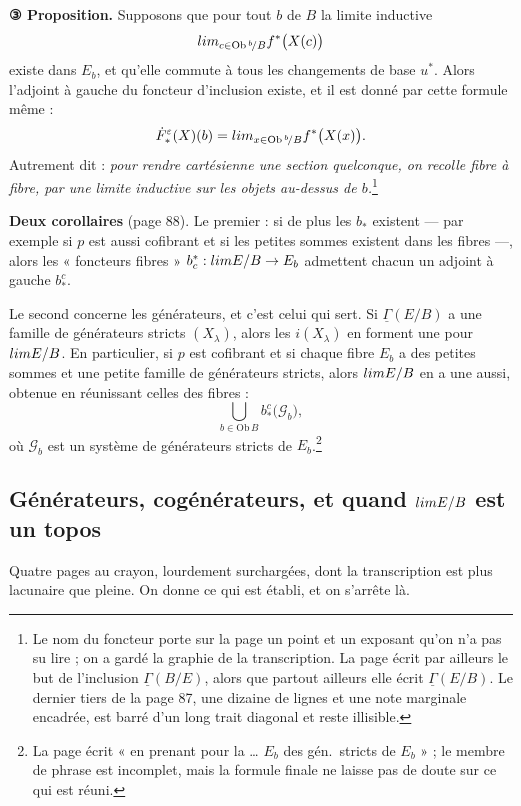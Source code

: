 \documentclass[11pt,a4paper]{article}
\begin{document}
\textbf{③ Proposition.} Supposons que pour tout $b$ de $B$ la limite inductive
\[
  \varinjlim_{c \in \mathrm{Ob}\,{}^{b}\!/B} f^{*}\bigl( X(c) \bigr)
\]
existe dans $E_{b}$, et qu'elle commute à tous les changements de base
$u^{*}$. Alors l'adjoint à gauche du foncteur d'inclusion existe, et il est
donné par cette formule même :
\[
  \dot{F}^{\varepsilon}_{*}(X)(b)
  = \varinjlim_{x \in \mathrm{Ob}\,{}^{b}\!/B} f^{*}\bigl( X(x) \bigr) .
\]
Autrement dit : \emph{pour rendre cartésienne une section quelconque, on
recolle fibre à fibre, par une limite inductive sur les objets au-dessus de
$b$.}\footnote{Le nom du foncteur porte sur la page un point et un exposant
qu'on n'a pas su lire ; on a gardé la graphie de la transcription. La page
écrit par ailleurs le but de l'inclusion $\underline{\Gamma}(B/E)$, alors que
partout ailleurs elle écrit $\underline{\Gamma}(E/B)$. Le dernier tiers de la
page 87, une dizaine de lignes et une note marginale encadrée, est barré d'un
long trait diagonal et reste illisible.}


\textbf{Deux corollaires} (page 88). Le premier : si de plus les $b_{*}$
existent — par exemple si $p$ est aussi cofibrant et si les petites sommes
existent dans les fibres —, alors les « foncteurs fibres »
$b^{*}_{c} : \varprojlim E/B \to E_{b}$ admettent chacun un adjoint à gauche
$b^{c}_{*}$.

Le second concerne les générateurs, et c'est celui qui sert. Si
$\underline{\Gamma}(E/B)$ a une famille de générateurs stricts
$(X_{\lambda})$, alors les $i(X_{\lambda})$ en forment une pour $\varprojlim
E/B$. En particulier, si $p$ est cofibrant et si chaque fibre $E_{b}$ a des
petites sommes et une petite famille de générateurs stricts, alors $\varprojlim
E/B$ en a une aussi, obtenue en réunissant celles des fibres :
\[
  \bigcup_{b \in \mathrm{Ob}\,B} b^{c}_{*}\bigl( \mathcal{G}_{b} \bigr) ,
\]
où $\mathcal{G}_{b}$ est un système de générateurs stricts de
$E_{b}$.\footnote{La page écrit « en prenant pour la … $E_{b}$ des gén.\
stricts de $E_{b}$ » ; le membre de phrase est incomplet, mais la formule
finale ne laisse pas de doute sur ce qui est réuni.}

\subsection*{Générateurs, cogénérateurs, et quand $\varprojlim E/B$ est un topos}

Quatre pages au crayon, lourdement surchargées, dont la transcription est plus
lacunaire que pleine. On donne ce qui est établi, et on s'arrête là.
\end{document}
